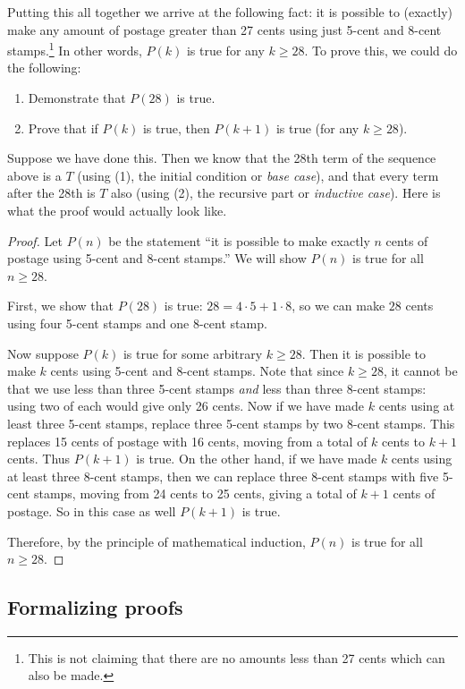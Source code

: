 \documentclass[12pt]{article}
\begin{document}
Putting this all together we arrive at the following fact: it is possible to (exactly) make any amount of postage greater than 27 cents using just 5-cent and 8-cent stamps.\footnote{This is not claiming that there are no amounts less than 27 cents which can also be made.}  In other words, $P(k)$ is true for any $k \ge 28$.  To prove this, we could do the following: 

\begin{enumerate}
  \item Demonstrate that $P(28)$ is true.
  \item Prove that if $P(k)$ is true, then $P(k+1)$ is true (for any $k \ge 28$).
\end{enumerate}
  
Suppose we have done this.  Then we know that the 28th term of the sequence above is a $T$ (using (1), the initial condition or {\em base case}), and that every term after the 28th is $T$ also (using (2), the recursive part or {\em inductive case}).  Here is what the proof would actually look like.

\begin{proof}
  Let $P(n)$ be the statement ``it is possible to make exactly $n$ cents of postage using 5-cent and 8-cent stamps.''  We will show $P(n)$ is true for all $n \ge 28$.
  
  First, we show that $P(28)$ is true: $28 =  4 \cdot 5+ 1\cdot 8$, so we can make $28$ cents using four 5-cent stamps and one 8-cent stamp.  
  
  Now suppose $P(k)$ is true for some arbitrary $k \ge 28$.  Then it is possible to make $k$ cents using 5-cent and 8-cent stamps.  Note that since $k \ge 28$, it cannot be that we use less than three 5-cent stamps {\em and} less than three 8-cent stamps: using two of each would give only 26 cents.  Now if we have made $k$ cents using at least three 5-cent stamps, replace three 5-cent stamps by two 8-cent stamps.  This replaces 15 cents of postage with 16 cents, moving from a total of $k$ cents to $k+1$ cents.  Thus $P(k+1)$ is true.  On the other hand, if we have made $k$ cents using at least three 8-cent stamps, then we can replace three 8-cent stamps with five 5-cent stamps, moving from 24 cents to 25 cents, giving a total of $k+1$ cents of postage.  So in this case as well $P(k+1)$ is true.  
  
  Therefore, by the principle of mathematical induction, $P(n)$ is true for all $n \ge 28$.
\end{proof}


\subsection{Formalizing proofs}
\end{document}
